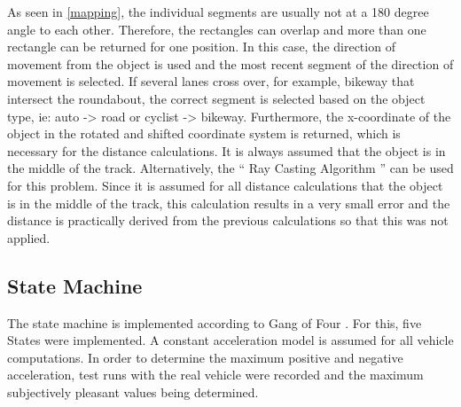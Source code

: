 \documentclass[11pt,oneside,openright]{mpreport}
\begin{document}
As seen in \cref{mapping}, the individual segments are usually not at a 180 degree angle to each other. Therefore, the rectangles can overlap and more than one rectangle can 
be returned for one position. In this case, the direction of movement from the object is used and the most recent segment of the direction of movement is selected.
If several lanes cross over, for example, bikeway that intersect the roundabout, the correct segment is selected based on the object type, ie: auto -> road or cyclist -> bikeway.
Furthermore, the x-coordinate of the object in the rotated and shifted coordinate system is returned, which is necessary for the distance calculations. It is always assumed that the
object is in the middle of the track. Alternatively, the `` Ray Casting Algorithm '' \cite{Galetzka2017} can be used for this problem. Since it is assumed for all
distance calculations that the object is in the middle of the track, this calculation results in a very small error and the distance is practically derived from the
previous calculations so that this was not applied.

\subsection{State Machine} 
The state machine is implemented according to Gang of Four \cite{lester2008gang}. For this, five States were implemented.
A constant acceleration model is assumed for all vehicle computations. In order to determine the maximum positive and negative acceleration, 
test runs with the real vehicle  were recorded and the maximum subjectively pleasant values being determined. 
\end{document}
